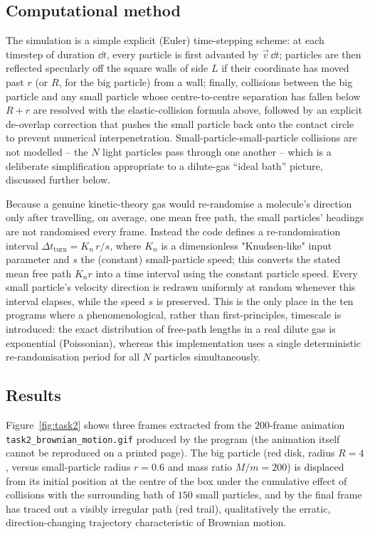 \documentclass[11pt]{article}
\begin{document}
\subsection{Computational method}
The simulation is a simple explicit (Euler) time-stepping scheme: at each timestep of duration $\dd t$, every particle is first advanted by $\vec v\,\dd t$; particles are then reflected specularly off the square walls of side $L$ if their coordinate has moved past $r$ (or $R$, for the big particle) from a wall; finally, collisions between the big particle and any small particle whose centre-to-centre separation has fallen below $R+r$ are resolved with the elastic-collision formula above, followed by an explicit de-overlap correction that pushes the small particle back onto the contact circle to prevent numerical interpenetration. Small-particle-small-particle collisions are not modelled -- the $N$ light particles pass through one another -- which is a deliberate simplification appropriate to a dilute-gas ``ideal bath'' picture, discussed further below.

Because a genuine kinetic-theory gas would re-randomise a molecule's direction only after travelling, on average, one mean free path, the small particles' headings are not randomised every frame. Instead the code defines a re-randomisation interval $\Delta t_\text{turn} = K_n\, r / s$, where $K_n$ is a dimensionless "Knudsen-like" input parameter and $s$ the (constant) small-particle speed; this converts the stated mean free path $K_n r$ into a time interval using the constant particle speed. Every small particle's velocity direction is redrawn uniformly at random whenever this interval elapses, while the speed $s$ is preserved. This is the only place in the ten programs where a phenomenological, rather than first-principles, timescale is introduced: the exact distribution of free-path lengths in a real dilute gas is exponential (Poissonian), whereas this implementation uses a single deterministic re-randomisation period for all $N$ particles simultaneously.

\subsection{Results}
Figure~\ref{fig:task2} shows three frames extracted from the $200$-frame animation \texttt{task2\_brownian\_motion.gif} produced by the program (the animation itself cannot be reproduced on a printed page). The big particle (red disk, radius $R=4$, versus small-particle radius $r=0.6$ and mass ratio $M/m=200$) is displaced from its initial position at the centre of the box under the cumulative effect of collisions with the surrounding bath of $150$ small particles, and by the final frame has traced out a visibly irregular path (red trail), qualitatively the erratic, direction-changing trajectory characteristic of Brownian motion.
\end{document}
